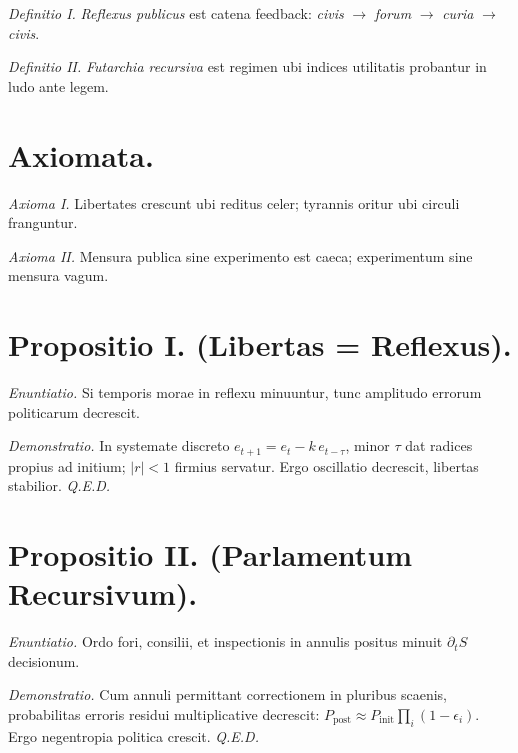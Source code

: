 \documentclass[12pt]{article}
\begin{document}
\textit{Definitio I.} \; \textit{Reflexus publicus} est catena feedback: \textit{civis} \(\to\) \textit{forum} \(\to\) \textit{curia} \(\to\) \textit{civis}.\

\textit{Definitio II.} \; \textit{Futarchia recursiva} est regimen ubi indices utilitatis probantur in ludo ante legem.

\section*{Axiomata.}

\textit{Axioma I.} \; Libertates crescunt ubi reditus celer; tyrannis oritur ubi circuli franguntur.

\textit{Axioma II.} \; Mensura publica sine experimento est caeca; experimentum sine mensura vagum.

\section*{Propositio I. \; (Libertas = Reflexus).}

\textit{Enuntiatio.} \; Si temporis morae in reflexu minuuntur, tunc amplitudo errorum politicarum decrescit.

\textit{Demonstratio.} In systemate discreto \(e_{t+1}=e_t - k\, e_{t-\tau}\), minor \(\tau\) dat radices propius ad initium; \(|r|<1\) firmius servatur. Ergo oscillatio decrescit, libertas stabilior. \textit{Q.E.D.}

\begin{center}
\end{center}

\section*{Propositio II. \; (Parlamentum Recursivum).}

\textit{Enuntiatio.} \; Ordo fori, consilii, et inspectionis in annulis positus minuit \(\partial_t S\) decisionum.

\textit{Demonstratio.} Cum annuli permittant correctionem in pluribus scaenis, probabilitas erroris residui multiplicative decrescit: \(P_\text{post} \approx P_\text{init}\prod_i (1-\epsilon_i)\). Ergo negentropia politica crescit. \textit{Q.E.D.}
\end{document}
